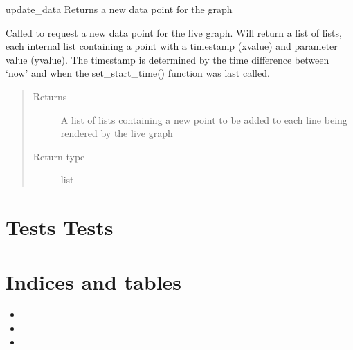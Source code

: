 \documentclass[letterpaper,10pt,english]{sphinxmanual}
\begin{document}

\begin{fulllineitems}
\label{\detokenize{index:graphs.graphing.update_data}}
update\_data Returns a new data point for the graph

Called to request a new data point for the live graph.
Will return a list of lists, each internal list containing
a point with a timestamp (x\sphinxhyphen{}value) and parameter value (y\sphinxhyphen{}value).
The timestamp is determined by the time difference between ‘now’ and
when the set\_start\_time() function was last called.
\begin{quote}\begin{description}
\item[{Returns}] \leavevmode
A list of lists containing a new point to be added to each line being rendered by the live graph

\item[{Return type}] \leavevmode
list

\end{description}\end{quote}

\end{fulllineitems}



\chapter{Tests Tests}
\label{\detokenize{index:module-tests.tests}}\label{\detokenize{index:tests-tests}}

\chapter{Indices and tables}
\label{\detokenize{index:indices-and-tables}}\begin{itemize}
\item {} 

\item {} 

\item {} 

\end{itemize}
\end{document}

